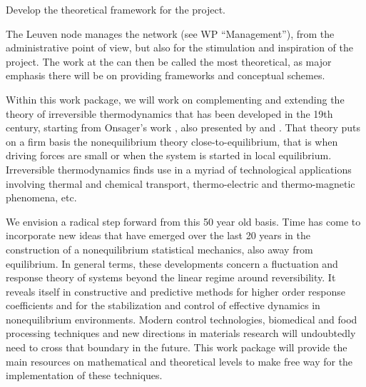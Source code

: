 \begin{workpackage}[id=WPcore,wphases=0-48,
  short=Gen. Theory, %
  title=General Theory, %
  lead=KUL,
  KULRM=66,UNIPDRM=8,TUERM=18,ULEIRM=6,USTUTTRM=6]

\newrefsection

\begin{mdframed}
\mobjectives
%
\begin{compactitem}
\item Develop the theoretical framework for the project.
\end{compactitem}

\mdescription
%
The Leuven node manages the network (see WP ``Management''), from the administrative point
of view, but also for the stimulation and inspiration of the project. The work at the 
can then be called the most theoretical, as major emphasis there will be on
providing frameworks and conceptual schemes.

Within this work package, we will work on complementing and extending the theory of
irreversible thermodynamics that has been developed in the 19th century, starting from
Onsager's work \cite{onsager1,onsager2}, also presented by \cite{degrootmazur} and \cite{kubo}.
%
That theory puts on a firm basis the nonequilibrium theory close-to-equilibrium, that is
when driving forces are small or when the system is started in local equilibrium.
%
Irreversible thermodynamics finds use in a myriad of technological applications involving
thermal and chemical transport, thermo-electric and thermo-magnetic phenomena, etc.

We envision a radical step forward from this 50 year old basis. Time has come to incorporate
new ideas that have emerged over the last 20 years in the construction of a nonequilibrium
statistical mechanics, also away from equilibrium.
%
In general terms, these developments concern a fluctuation and response theory of systems
beyond the linear regime around reversibility. It reveals itself in constructive and
predictive methods for higher order response coefficients and for the stabilization and
control of effective dynamics in nonequilibrium environments.
%
Modern control technologies, biomedical and food processing techniques and new directions in
materials research will undoubtedly need to cross that boundary in the future. This
work package will provide the main resources on mathematical and theoretical levels to make
free way for the implementation of these techniques.


\end{mdframed}
\end{workpackage}
